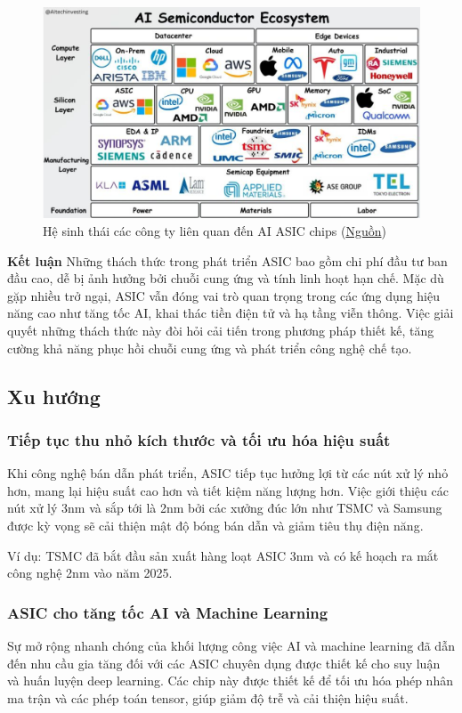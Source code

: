 \documentclass[a4paper]{article}
\begin{document}
\begin{figure}[H]
    \centering
    \includegraphics[width=0.75\linewidth]{assets/ai-semiconductor.png}
    \caption{Hệ sinh thái các công ty liên quan đến AI ASIC chips (\href{https://techovedas.com/what-are-major-players-in-ai-ecosystem/}{Nguồn})}
    \label{fig:enter-label}
\end{figure}

\textbf{Kết luận}
Những thách thức trong phát triển ASIC bao gồm chi phí đầu tư ban đầu cao, dễ bị ảnh hưởng bởi chuỗi cung ứng và tính linh hoạt hạn chế. Mặc dù gặp nhiều trở ngại, ASIC vẫn đóng vai trò quan trọng trong các ứng dụng hiệu năng cao như tăng tốc AI, khai thác tiền điện tử và hạ tầng viễn thông. Việc giải quyết những thách thức này đòi hỏi cải tiến trong phương pháp thiết kế, tăng cường khả năng phục hồi chuỗi cung ứng và phát triển công nghệ chế tạo.

\subsection{Xu hướng}
\subsubsection{Tiếp tục thu nhỏ kích thước và tối ưu hóa hiệu suất}
Khi công nghệ bán dẫn phát triển, ASIC tiếp tục hưởng lợi từ các nút xử lý nhỏ hơn, mang lại hiệu suất cao hơn và tiết kiệm năng lượng hơn. Việc giới thiệu các nút xử lý 3nm và sắp tới là 2nm bởi các xưởng đúc lớn như TSMC và Samsung được kỳ vọng sẽ cải thiện mật độ bóng bán dẫn và giảm tiêu thụ điện năng.  

Ví dụ: TSMC đã bắt đầu sản xuất hàng loạt ASIC 3nm và có kế hoạch ra mắt công nghệ 2nm vào năm 2025.
\subsubsection{ASIC cho tăng tốc AI và Machine Learning}
Sự mở rộng nhanh chóng của khối lượng công việc AI và machine learning đã dẫn đến nhu cầu gia tăng đối với các ASIC chuyên dụng được thiết kế cho suy luận và huấn luyện deep learning. Các chip này được thiết kế để tối ưu hóa phép nhân ma trận và các phép toán tensor, giúp giảm độ trễ và cải thiện hiệu suất.
\end{document}
